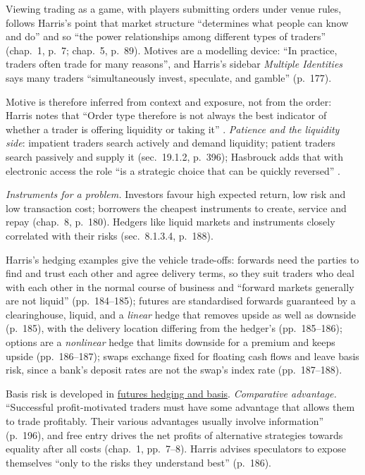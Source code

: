 \begin{qfdefinition}
 Viewing trading as a game, with players submitting orders under venue rules, follows Harris's point that market structure ``determines what people can know and do'' and so ``the power relationships among different types of traders'' (chap.~1, p.~7; chap.~5, p.~89). Motives are a modelling device: ``In practice, traders often trade for many reasons'', and Harris's sidebar \emph{Multiple Identities} says many traders ``simultaneously invest, speculate, and gamble'' (p.~177).

Motive is therefore inferred from context and exposure, not from the order: Harris notes that ``Order type therefore is not always the best indicator of whether a trader is offering liquidity or taking it'' \citep[chap.~19, sec.~19.3.1, p.~400]{alpha-harris}. \emph{Patience and the liquidity side}: impatient traders search actively and demand liquidity; patient traders search passively and supply it (sec.~19.1.2, p.~396); Hasbrouck adds that with electronic access the role ``is a strategic choice that can be quickly reversed'' \citep[chap.~1, sec.~1.2, p.~5]{s6-hasbrouck}.

 \emph{Instruments for a problem.} Investors favour high expected return, low risk and low transaction cost; borrowers the cheapest instruments to create, service and repay (chap.~8, p.~180). Hedgers like liquid markets and instruments closely correlated with their risks (sec.~8.1.3.4, p.~188).

Harris's hedging examples give the vehicle trade-offs: forwards need the parties to find and trust each other and agree delivery terms, so they suit traders who deal with each other in the normal course of business and ``forward markets generally are not liquid'' (pp.~184--185); futures are standardised forwards guaranteed by a clearinghouse, liquid, and a \emph{linear} hedge that removes upside as well as downside (p.~185), with the delivery location differing from the hedger's (pp.~185--186); options are a \emph{nonlinear} hedge that limits downside for a premium and keeps upside (pp.~186--187); swaps exchange fixed for floating cash flows and leave basis risk, since a bank's deposit rates are not the swap's index rate (pp.~187--188).

Basis risk is developed in \hyperref[def:futures-hedge-basis]{futures hedging and basis}. \emph{Comparative advantage.} ``Successful profit-motivated traders must have some advantage that allows them to trade profitably. Their various advantages usually involve information'' (p.~196), and free entry drives the net profits of alternative strategies towards equality after all costs (chap.~1, pp.~7--8). Harris advises speculators to expose themselves ``only to the risks they understand best'' (p.~186).


\end{qfdefinition}
